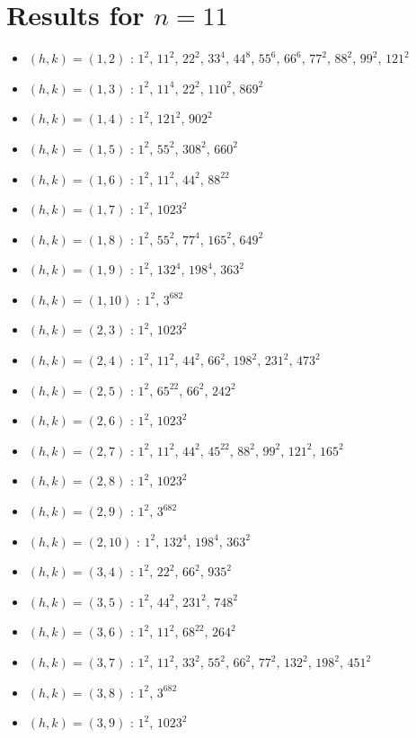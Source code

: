 \section{Results for $n=11$}
\begin{itemize}
\item $(h,k)=(1,2)$ : $1^{2}$, $11^{2}$, $22^{2}$, $33^{4}$, $44^{8}$, $55^{6}$, $66^{6}$, $77^{2}$, $88^{2}$, $99^{2}$, $121^{2}$
\item $(h,k)=(1,3)$ : $1^{2}$, $11^{4}$, $22^{2}$, $110^{2}$, $869^{2}$
\item $(h,k)=(1,4)$ : $1^{2}$, $121^{2}$, $902^{2}$
\item $(h,k)=(1,5)$ : $1^{2}$, $55^{2}$, $308^{2}$, $660^{2}$
\item $(h,k)=(1,6)$ : $1^{2}$, $11^{2}$, $44^{2}$, $88^{22}$
\item $(h,k)=(1,7)$ : $1^{2}$, $1023^{2}$
\item $(h,k)=(1,8)$ : $1^{2}$, $55^{2}$, $77^{4}$, $165^{2}$, $649^{2}$
\item $(h,k)=(1,9)$ : $1^{2}$, $132^{4}$, $198^{4}$, $363^{2}$
\item $(h,k)=(1,10)$ : $1^{2}$, $3^{682}$
\item $(h,k)=(2,3)$ : $1^{2}$, $1023^{2}$
\item $(h,k)=(2,4)$ : $1^{2}$, $11^{2}$, $44^{2}$, $66^{2}$, $198^{2}$, $231^{2}$, $473^{2}$
\item $(h,k)=(2,5)$ : $1^{2}$, $65^{22}$, $66^{2}$, $242^{2}$
\item $(h,k)=(2,6)$ : $1^{2}$, $1023^{2}$
\item $(h,k)=(2,7)$ : $1^{2}$, $11^{2}$, $44^{2}$, $45^{22}$, $88^{2}$, $99^{2}$, $121^{2}$, $165^{2}$
\item $(h,k)=(2,8)$ : $1^{2}$, $1023^{2}$
\item $(h,k)=(2,9)$ : $1^{2}$, $3^{682}$
\item $(h,k)=(2,10)$ : $1^{2}$, $132^{4}$, $198^{4}$, $363^{2}$
\item $(h,k)=(3,4)$ : $1^{2}$, $22^{2}$, $66^{2}$, $935^{2}$
\item $(h,k)=(3,5)$ : $1^{2}$, $44^{2}$, $231^{2}$, $748^{2}$
\item $(h,k)=(3,6)$ : $1^{2}$, $11^{2}$, $68^{22}$, $264^{2}$
\item $(h,k)=(3,7)$ : $1^{2}$, $11^{2}$, $33^{2}$, $55^{2}$, $66^{2}$, $77^{2}$, $132^{2}$, $198^{2}$, $451^{2}$
\item $(h,k)=(3,8)$ : $1^{2}$, $3^{682}$
\item $(h,k)=(3,9)$ : $1^{2}$, $1023^{2}$

\end{itemize}
